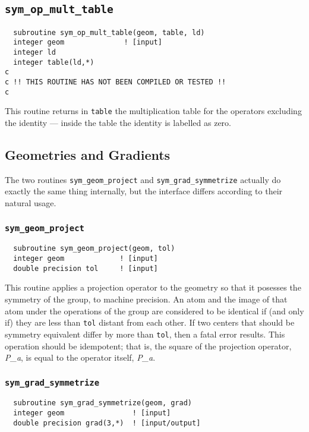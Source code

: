 \subsection{{\tt sym\_op\_mult\_table}}
\begin{verbatim}
  subroutine sym_op_mult_table(geom, table, ld)
  integer geom              ! [input]
  integer ld
  integer table(ld,*)
c
c !! THIS ROUTINE HAS NOT BEEN COMPILED OR TESTED !!
c
\end{verbatim}
This routine returns in \verb+table+ the multiplication table for the operators
excluding the identity --- inside the table the identity is labelled
as zero.

\subsection{Geometries and Gradients}

The two routines {\tt sym\_geom\_project} and {\tt sym\_grad\_symmetrize} 
 actually do exactly the same thing internally, but the
interface differs according to their natural usage.

\subsubsection{{\tt sym\_geom\_project}}
\begin{verbatim}
  subroutine sym_geom_project(geom, tol)
  integer geom             ! [input]
  double precision tol     ! [input]
\end{verbatim}

This routine applies a projection operator to the geometry so that it posesses the
symmetry of the group, to machine precision.  An atom and the image of
that atom under the operations of the group are considered to be
identical if (and only if) they are less than \verb+tol+ distant from each
other.  If two centers that should be symmetry equivalent differ
by more than \verb+tol+, then a fatal error results.  This operation
should be idempotent; that is, the square of the projection operator, {\em P\_a}, is 
equal to the operator itself, {\em P\_a}.

\subsubsection{{\tt sym\_grad\_symmetrize}}
\begin{verbatim}
  subroutine sym_grad_symmetrize(geom, grad)
  integer geom                ! [input]
  double precision grad(3,*)  ! [input/output]
\end{verbatim}

